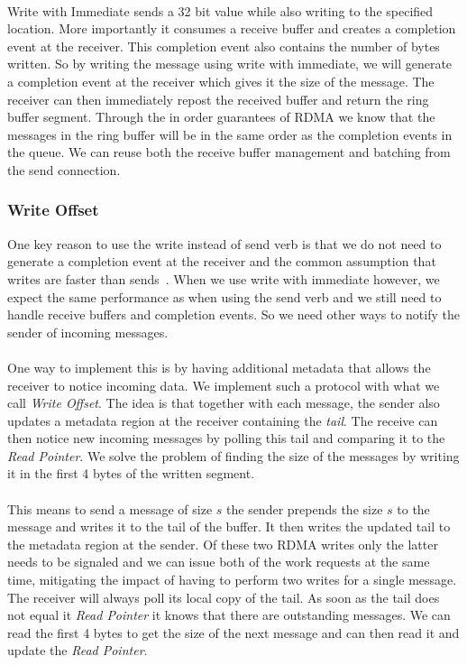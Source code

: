 \paragraph{} Write with Immediate sends a 32 bit value while also writing to the specified location. More importantly it 
consumes a receive buffer and creates a completion event at the receiver. This completion event also contains the number 
of bytes written. So by writing the message using write with immediate, we will generate a completion event at the receiver
which gives it the size of the message. The receiver can then immediately repost the received buffer and return the ring 
buffer segment. Through the in order guarantees of RDMA we know that the messages in the ring buffer will be in the same
order as the completion events in the queue. We can reuse both the receive buffer management and batching from the send 
connection.


\subsubsection{Write Offset}

One key reason to use the write instead of send verb is that we do not need to generate a completion event at the receiver
and the common assumption that writes are faster than sends~\cite{}. When we use 
write with immediate however, we expect the same performance as when using the send verb and we still need to handle receive
buffers and completion events. So we need other ways to notify the sender of incoming messages.

\paragraph{} One way to implement this is by having additional metadata that allows the receiver to notice incoming data.
We implement such a protocol with what we call \emph{Write Offset}. The idea is that together with each message, the sender
also updates a metadata region at the receiver containing the \emph{tail}. The receive can then notice new incoming messages
by polling this tail and comparing it to the \emph{Read Pointer}. We solve the problem of finding the size of the messages by
writing it in the first 4 bytes of the written segment.

\paragraph{} This means to send a message of size $s$ the sender prepends the size $s$ to the message and writes it to the
tail of the buffer. It then writes the updated tail to the metadata region at the sender. Of these two RDMA writes only the 
latter needs to be signaled and we can issue both of the work requests at the same time, mitigating the impact of having to 
perform two writes for a single message. The receiver will always poll its local copy of the tail. As soon as the tail does 
not equal it \emph{Read Pointer} it knows that there are outstanding messages. We can read the first 4 bytes to get the size
of the next message and can then read it and update the \emph{Read Pointer}.

